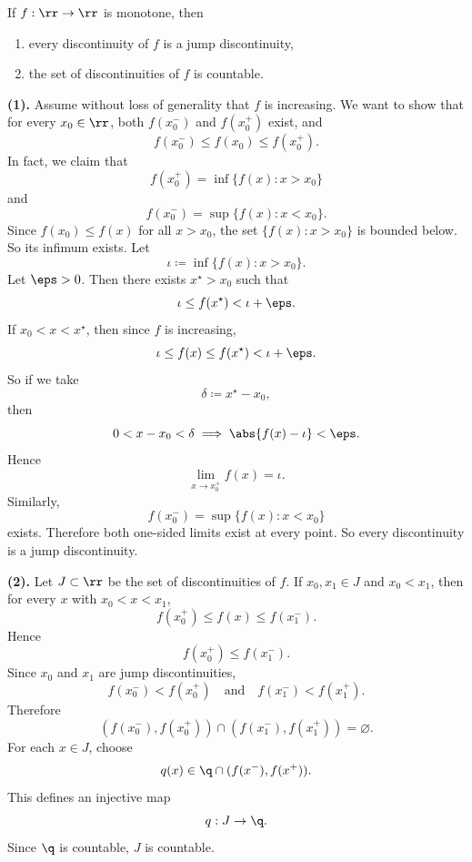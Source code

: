 

\begin{theorem}{
    If $f:\rr\to\rr$ is monotone, then
    \begin{enumerate}
        \item every discontinuity of $f$ is a jump discontinuity,
        \item the set of discontinuities of $f$ is countable.
    \end{enumerate}
}
    \textbf{(1).}
    Assume without loss of generality that $f$ is increasing.
    We want to show that for every $x_0\in\rr$, both $f(x_0^-)$ and $f(x_0^+)$ exist, and
    \[
        f(x_0^-)\leq f(x_0)\leq f(x_0^+).
    \]
    In fact, we claim that
    \[
        f(x_0^+) = \inf\{f(x) : x > x_0\}
    \]
    and
    \[
        f(x_0^-) = \sup\{f(x) : x < x_0\}.
    \]
    Since $f(x_0)\leq f(x)$ for all $x>x_0$, the set $\{f(x):x>x_0\}$ is bounded below.
    So its infimum exists.
    Let
    \[
        \iota \coloneqq \inf\{f(x):x>x_0\}.
    \]
    Let $\eps > 0$.
    Then there exists $x^\star > x_0$ such that
    \[
        \iota \leq f(x^\star) < \iota + \eps.
    \]
    If $x_0 < x < x^\star$, then since $f$ is increasing,
    \[
        \iota \leq f(x)\leq f(x^\star) < \iota + \eps.
    \]
    So if we take
    \[
        \delta \coloneqq x^\star - x_0,
    \]
    then
    \[
        0 < x-x_0 < \delta \implies \abs{f(x)-\iota}<\eps.
    \]
    Hence
    \[
        \lim_{x\to x_0^+} f(x) = \iota.
    \]
    Similarly,
    \[
        f(x_0^-) = \sup\{f(x):x<x_0\}
    \]
    exists.
    Therefore both one-sided limits exist at every point.
    So every discontinuity is a jump discontinuity.

    \textbf{(2).}
    Let $J\subset\rr$ be the set of discontinuities of $f$.
    If $x_0,x_1\in J$ and $x_0<x_1$, then for every $x$ with $x_0<x<x_1$,
    \[
        f(x_0^+)\leq f(x)\leq f(x_1^-).
    \]
    Hence
    \[
        f(x_0^+) \leq f(x_1^-).
    \]
    Since $x_0$ and $x_1$ are jump discontinuities,
    \[
        f(x_0^-) < f(x_0^+)
        \quad\text{and}\quad
        f(x_1^-) < f(x_1^+).
    \]
    Therefore
    \[
        (f(x_0^-),f(x_0^+))\cap (f(x_1^-),f(x_1^+)) = \varnothing.
    \]
    For each $x\in J$, choose
    \[
        q(x)\in \q\cap (f(x^-),f(x^+)).
    \]
    This defines an injective map
    \[
        q:J\to\q.
    \]
    Since $\q$ is countable, $J$ is countable.
\end{theorem}
